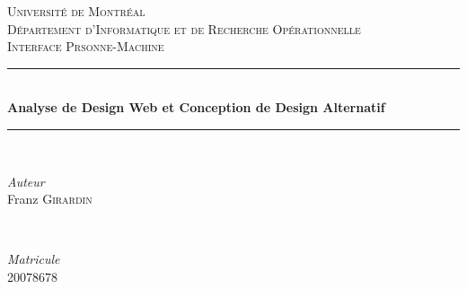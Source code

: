 \documentclass[9pt]{report}
\begin{document}
\begin{titlepage} %
	\newcommand{\HRule}{\rule{\linewidth}{0.5mm}} %
	
	\center %
	
	
	\textsc{\LARGE Université de Montréal}\\[1.5cm] %
	
	\textsc{\Large Département d'Informatique et de Recherche Opérationnelle}\\[0.5cm] %
	
	\textsc{\large Interface Prsonne-Machine}\\[0.5cm] %
	
	
	\HRule\\[0.4cm]
	
	{\huge\bfseries Analyse de Design Web et Conception de Design Alternatif}\\[0.4cm] %
	
	\HRule\\[1.5cm]
	
	
	\begin{minipage}{0.4\textwidth}
		\begin{flushleft}
			\large
			\textit{Auteur}\\
		Franz \textsc{Girardin} %
		\end{flushleft}
	\end{minipage}
	~
	\begin{minipage}{0.4\textwidth}
		\begin{flushright}
			\large
			\textit{Matricule}\\
			\textsc{20078678} %
		\end{flushright}
	\end{minipage}
	
	

\end{titlepage}
\end{document}
